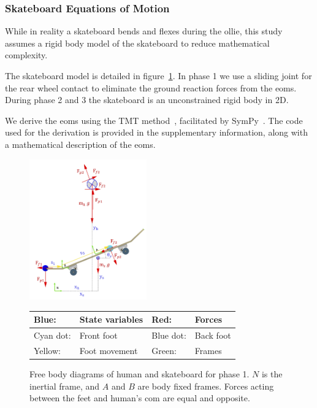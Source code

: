 \documentclass[default,iicol]{sn-jnl}
\begin{document}
\subsubsection{Skateboard Equations of Motion}
While in reality a skateboard bends and flexes during the ollie, this study assumes a rigid body model of the skateboard to reduce mathematical complexity.

The skateboard model is detailed in figure~\ref{fig:FBD}. In phase 1 we use a sliding joint for the rear wheel contact to eliminate the ground reaction forces from the \glspl{eom}.
During phase 2 and 3 the skateboard is an unconstrained rigid body in 2D. 

We derive the \glspl{eom} using the TMT method~\cite{vallery_heike_advanced_2018}, facilitated by SymPy~\cite{meurer_sympy_2017}.
The code used for the derivation is provided in the supplementary information, along with a mathematical description of the \glspl{eom}.

\begin{figure}
    \centering
    \includegraphics[width=0.45\textwidth]{figure/FBD_skater_feet.png}
    \footnotesize\begin{tabular}{|l l|l l|} \hline
    \color{blue}Blue: & State variables &\color{red} Red: & Forces \\ \hline
    \color{cyan}Cyan dot: & Front foot & \color{blue}Blue dot: & Back foot \\ \hline
    \color{yellow}Yellow: & Foot movement & \color{green}Green: & Frames \\ \hline
    \end{tabular}
    \caption[Free Body Diagrams phase 2 and 3]{Free body diagrams of human and skateboard for phase 1. $N$ is the inertial frame, and $A$ and $B$ are body fixed frames. Forces acting between the feet and human's \gls{com} are equal and opposite.}
    \label{fig:FBD}
\end{figure}
\end{document}
